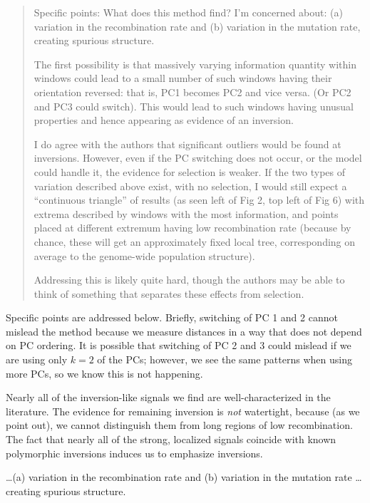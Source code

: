 \begin{quote}
    Specific points: What does this method find? I'm concerned about:
    (a) variation in the recombination rate
    and (b) variation in the mutation rate, creating spurious structure.

    The first possibility is that massively varying information quantity
    within windows could lead to a small number of such windows having their
    orientation reversed: that is, PC1 becomes PC2 and vice versa. (Or PC2 and PC3
    could switch). This would lead to such windows having unusual properties and
    hence appearing as evidence of an inversion.

    I do agree with the authors that significant outliers would be found at
    inversions. However, even if the PC switching does not occur, or the model could
    handle it, the evidence for selection is weaker.  If the two types of variation
    described above exist, with no selection, I would still expect a ``continuous
    triangle'' of results (as seen left of Fig 2, top left of Fig 6) with extrema
    described by windows with the most information, and points placed at different
    extremum having low recombination rate (because by chance, these will get an
    approximately fixed local tree, corresponding on average to the genome-wide
    population structure).

    Addressing this is likely quite hard, though the authors may be able to think of
    something that separates these effects from selection.
\end{quote}

Specific points are addressed below.
Briefly, switching of PC 1 and 2 cannot mislead the method
because we measure distances in a way that does not depend on PC ordering.
It is possible that switching of PC 2 and 3 could mislead if we are using only $k=2$ of the PCs;
however, we see the same patterns when using more PCs, so we know this is not happening.

Nearly all of the inversion-like signals we find are well-characterized in the literature.
The evidence for remaining inversion is \emph{not} watertight,
because (as we point out), we cannot distinguish them from long regions of low recombination.
The fact that nearly all of the strong, localized signals coincide with known polymorphic inversions
induces us to emphasize inversions.


\begin{point}{}
    \ldots (a) variation in the recombination rate and 
    (b) variation in the mutation rate \ldots creating spurious structure.
\end{point}

